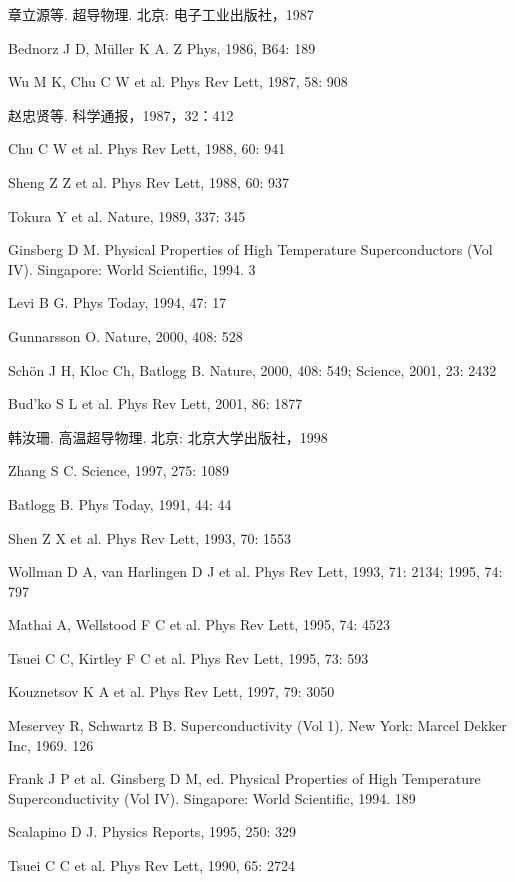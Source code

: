 \begin{canKao}
\begin{enumerate}[label={[\arabic*]}, leftmargin=2.2em, itemsep=0pt]
\item 章立源等. 超导物理. 北京: 电子工业出版社，1987
\item Bednorz J D, Müller K A. Z Phys, 1986, B64: 189
\item Wu M K, Chu C W et al. Phys Rev Lett, 1987, 58: 908
\item 赵忠贤等. 科学通报，1987，32：412
\item Chu C W et al. Phys Rev Lett, 1988, 60: 941
\item Sheng Z Z et al. Phys Rev Lett, 1988, 60: 937
\item Tokura Y et al. Nature, 1989, 337: 345
\item Ginsberg D M. Physical Properties of High Temperature Superconductors (Vol IV). Singapore: World Scientific, 1994. 3
\item Levi B G. Phys Today, 1994, 47: 17
\item Gunnarsson O. Nature, 2000, 408: 528
\item Schön J H, Kloc Ch, Batlogg B. Nature, 2000, 408: 549; Science, 2001, 23: 2432
\item Bud'ko S L et al. Phys Rev Lett, 2001, 86: 1877
\item 韩汝珊. 高温超导物理. 北京: 北京大学出版社，1998
\item Zhang S C. Science, 1997, 275: 1089
\item Batlogg B. Phys Today, 1991, 44: 44
\item Shen Z X et al. Phys Rev Lett, 1993, 70: 1553
\item Wollman D A, van Harlingen D J et al. Phys Rev Lett, 1993, 71: 2134; 1995, 74: 797
\item Mathai A, Wellstood F C et al. Phys Rev Lett, 1995, 74: 4523
\item Tsuei C C, Kirtley F C et al. Phys Rev Lett, 1995, 73: 593
\item Kouznetsov K A et al. Phys Rev Lett, 1997, 79: 3050
\item Meservey R, Schwartz B B. Superconductivity (Vol 1). New York: Marcel Dekker Inc, 1969. 126
\item Frank J P et al. Ginsberg D M, ed. Physical Properties of High Temperature Superconductivity (Vol IV). Singapore: World Scientific, 1994. 189
\item Scalapino D J. Physics Reports, 1995, 250: 329
\item Tsuei C C et al. Phys Rev Lett, 1990, 65: 2724

\end{enumerate}
\end{canKao}
